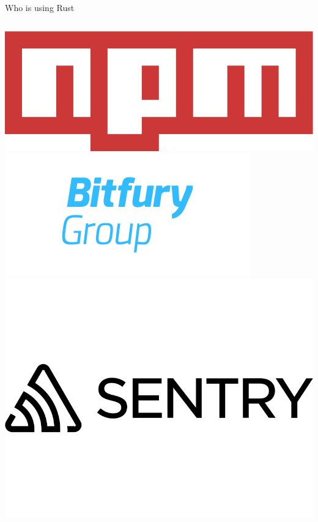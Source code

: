 \documentclass[12pt, aspectratio=169]{beamer}
\begin{document}
\begin{frame}{Who is using Rust}
  \begin{columns}
    \includegraphics[width=\textwidth]{images/npm.png}
    \includegraphics[width=\textwidth]{images/bitfury.png}
    \includegraphics[width=\textwidth]{images/sentry.png}
  \end{columns}


\end{frame}
\end{document}
